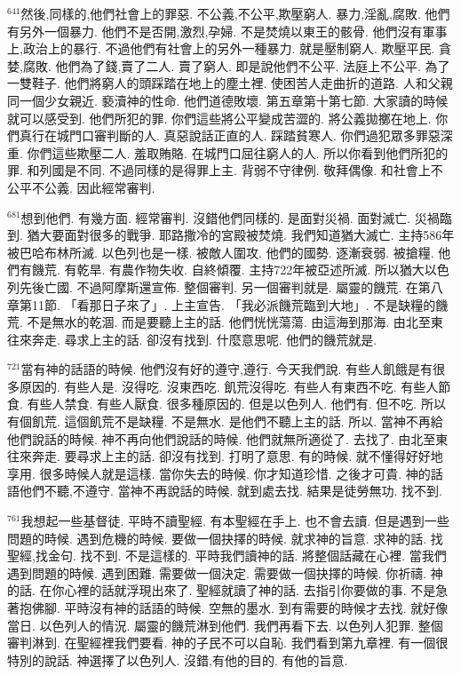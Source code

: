 \documentclass{book}
\begin{document}
$^{641}$然後,同樣的,他們社會上的罪惡.
不公義,不公平,欺壓窮人.
暴力,淫亂,腐敗.
他們有另外一個暴力.
他們不是否開,激烈,孕婦.
不是焚燒以東王的骸骨.
他們沒有軍事上,政治上的暴行.
不過他們有社會上的另外一種暴力.
就是壓制窮人.
欺壓平民.
貪婪,腐敗.
他們為了錢,賣了二人.
賣了窮人.
即是說他們不公平.
法庭上不公平.
為了一雙鞋子.
他們將窮人的頭踩踏在地上的塵土裡.
使困苦人走曲折的道路.
人和父親同一個少女親近.
褻瀆神的性命.
他們道德敗壞.
第五章第十第七節.
大家讀的時候就可以感受到.
他們所犯的罪.
你們這些將公平變成苦澀的.
將公義拋擲在地上.
你們真行在城門口審判斷的人.
真惡說話正直的人.
踩踏貧寒人.
你們過犯眾多罪惡深重.
你們這些欺壓二人.
羞取賄賂.
在城門口屈往窮人的人.
所以你看到他們所犯的罪.
和列國是不同.
不過同樣的是得罪上主.
背弱不守律例.
敬拜偶像.
和社會上不公平不公義.
因此經常審判.

$^{681}$想到他們.
有幾方面.
經常審判.
沒錯他們同樣的.
是面對災禍.
面對滅亡.
災禍臨到.
猶大要面對很多的戰爭.
耶路撒冷的宮殿被焚燒.
我們知道猶大滅亡.
主持586年被巴哈布林所滅.
以色列也是一樣.
被敵人圍攻.
他們的國勢.
逐漸衰弱.
被搶糧.
他們有饑荒.
有乾旱.
有農作物失收.
自終傾覆.
主持722年被亞述所滅.
所以猶大以色列先後亡國.
不過阿摩斯還宣佈.
整個審判.
另一個審判就是.
屬靈的饑荒.
在第八章第11節.
「看那日子來了」.
上主宣告.
「我必派饑荒臨到大地」.
不是缺糧的饑荒.
不是無水的乾涸.
而是要聽上主的話.
他們恍恍蕩蕩.
由這海到那海.
由北至東往來奔走.
尋求上主的話.
卻沒有找到.
什麼意思呢.
他們的饑荒就是.

$^{721}$當有神的話語的時候.
他們沒有好的遵守,遵行.
今天我們說.
有些人飢餓是有很多原因的.
有些人是.
沒得吃.
沒東西吃.
飢荒沒得吃.
有些人有東西不吃.
有些人節食.
有些人禁食.
有些人厭食.
很多種原因的.
但是以色列人.
他們有.
但不吃.
所以有個飢荒.
這個飢荒不是缺糧.
不是無水.
是他們不聽上主的話.
所以.
當神不再給他們說話的時候.
神不再向他們說話的時候.
他們就無所適從了.
去找了.
由北至東往來奔走.
要尋求上主的話.
卻沒有找到.
打明了意思.
有的時候.
就不懂得好好地享用.
很多時候人就是這樣.
當你失去的時候.
你才知道珍惜.
之後才可貴.
神的話語他們不聽,不遵守.
當神不再說話的時候.
就到處去找.
結果是徒勞無功.
找不到.

$^{761}$我想起一些基督徒.
平時不讀聖經.
有本聖經在手上.
也不會去讀.
但是遇到一些問題的時候.
遇到危機的時候.
要做一個抉擇的時候.
就求神的旨意.
求神的話.
找聖經,找金句.
找不到.
不是這樣的.
平時我們讀神的話.
將整個話藏在心裡.
當我們遇到問題的時候.
遇到困難.
需要做一個決定.
需要做一個抉擇的時候.
你祈禱.
神的話.
在你心裡的話就浮現出來了.
聖經就讀了神的話.
去指引你要做的事.
不是急著抱佛腳.
平時沒有神的話語的時候.
空無的墨水.
到有需要的時候才去找.
就好像當日.
以色列人的情況.
屬靈的饑荒淋到他們.
我們再看下去.
以色列人犯罪.
整個審判淋到.
在聖經裡我們要看.
神的子民不可以自恥.
我們看到第九章裡.
有一個很特別的說話.
神選擇了以色列人.
沒錯,有他的目的.
有他的旨意.
\end{document}
